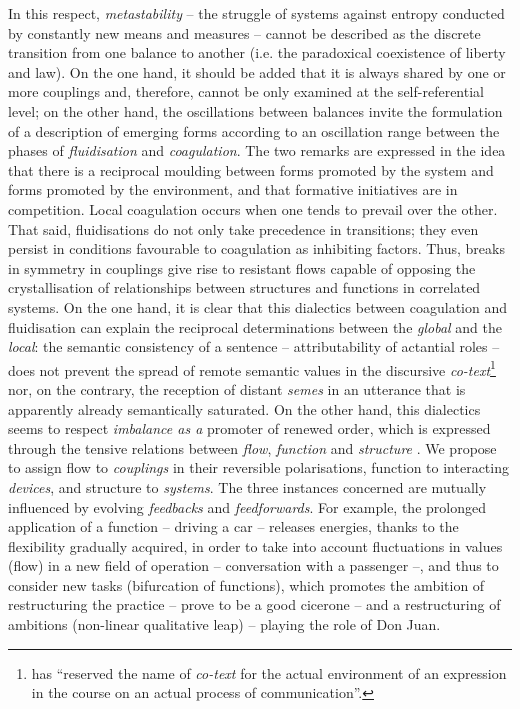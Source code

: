 \documentclass[output=paper]{langscibook}
\begin{document}
In this respect, \textit{metastability} – the struggle of systems against entropy conducted by constantly new means and measures – cannot be described as the discrete transition from one balance to another (i.e. the paradoxical coexistence of liberty and law). On the one hand, it should be added that it is always shared by one or more couplings and, therefore, cannot be only examined at the self-referential level; on the other hand, the oscillations between balances invite the formulation of a description of emerging forms according to an oscillation range between the phases of \textit{fluidisation} and \textit{coagulation}. The two remarks are expressed in the idea that there is a reciprocal moulding between forms promoted by the system and forms promoted by the environment, and that formative initiatives are in competition. Local coagulation occurs when one tends to prevail over the other. That said, fluidisations do not only take precedence in transitions; they even persist in conditions favourable to coagulation as inhibiting factors. Thus, breaks in symmetry in couplings give rise to resistant flows capable of opposing the crystallisation of relationships between structures and functions in correlated systems. On the one hand, it is clear that this dialectics between coagulation and fluidisation can explain the reciprocal determinations between the \textit{global} and the \textit{local}: the semantic consistency of a sentence – attributability of actantial roles – does not prevent the spread of remote semantic values in the discursive \textit{co-text}\footnote{\citet[215]{Eco1994} has “reserved the name of \textit{co-text}  for the actual environment of an expression in the course on an actual process of communication”.} nor, on the contrary, the reception of distant \textit{semes} in an utterance that is apparently already semantically saturated. On the other hand, this dialectics seems to respect \textit{imbalance as a} promoter of renewed order, which is expressed through the tensive relations between \textit{flow}, \textit{function} and \textit{structure} \citep{Prigogine1983}. We propose to assign flow to \textit{couplings} in their reversible polarisations, function to interacting \textit{devices}, and structure to \textit{systems}. The three instances concerned are mutually influenced by evolving \textit{feedbacks} and \textit{feedforwards}. For example, the prolonged application of a function – driving a car – releases energies, thanks to the flexibility gradually acquired, in order to take into account fluctuations in values (flow) in a new field of operation – conversation with a passenger –, and thus to consider new tasks (bifurcation of functions), which promotes the ambition of restructuring the practice – prove to be a good cicerone -- and a restructuring of ambitions (non-linear qualitative leap) – playing the role of Don Juan.
\end{document}
